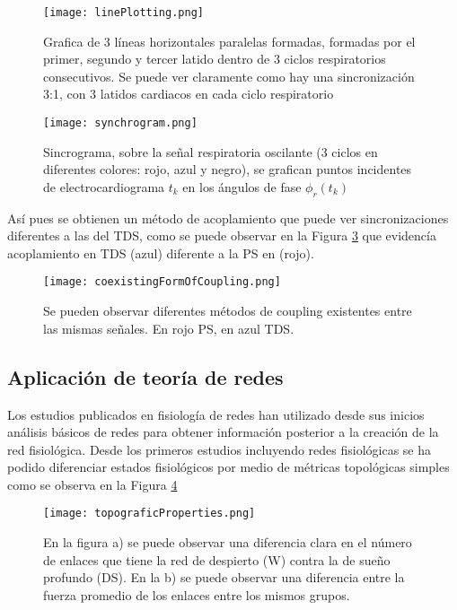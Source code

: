 \documentclass[twoside,twocolumn]{article}
\begin{document}
\begin{figure}[H]
  \texttt{[image: linePlotting.png]}
  \caption{Grafica de 3 líneas horizontales paralelas formadas, formadas por el primer, segundo y tercer latido dentro de 3 ciclos respiratorios consecutivos. Se puede ver claramente como hay una sincronización 3:1, con 3 latidos cardiacos en cada ciclo respiratorio}
  \label{fig:linePlotting}
\end{figure}

\begin{figure}[H]
  \texttt{[image: synchrogram.png]}
  \caption{Sincrograma, sobre la señal respiratoria oscilante (3 ciclos en diferentes colores: rojo, azul y negro), se grafican puntos incidentes de electrocardiograma $t_k$ en los ángulos de fase $\phi_r(t_k)$\cite{bartsch2014coexisting}}
  \label{fig:synchrogram}
\end{figure}

Así pues se obtienen un método de acoplamiento que puede ver sincronizaciones diferentes a las del TDS, como se puede observar en la Figura \ref{fig:coexistingFormOfCoupling} que evidencía acoplamiento en TDS (azul) diferente a la PS en (rojo).

\begin{figure}[H]
  \texttt{[image: coexistingFormOfCoupling.png]}
  \caption{Se pueden observar diferentes métodos de coupling existentes entre las mismas señales. En rojo PS, en azul TDS.}
  \label{fig:coexistingFormOfCoupling}
\end{figure}

\subsection{Aplicación de teoría de redes}
Los estudios publicados en fisiología de redes han utilizado desde sus inicios análisis básicos de redes para obtener información posterior a la creación de la red fisiológica.
Desde los primeros estudios incluyendo redes fisiológicas se ha podido diferenciar estados fisiológicos por medio de métricas topológicas simples como se observa en la Figura \ref{fig:topograficProperties}

\begin{figure}[H]
  \texttt{[image: topograficProperties.png]}
  \caption{En la figura a) se puede observar una diferencia clara en el número de enlaces que tiene la red de despierto (W) contra la de sueño profundo (DS). En la b) se puede observar una diferencia entre la fuerza promedio de los enlaces entre los mismos grupos.}
  \label{fig:topograficProperties}
\end{figure}
\end{document}
